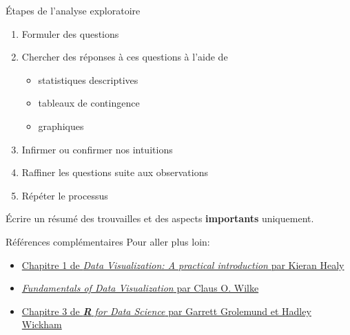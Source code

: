 \documentclass[
  ignorenonframetext,
]{beamer}
\providecommand{\tightlist}{%
  \setlength{\itemsep}{0pt}\setlength{\parskip}{0pt}}\usepackage{longtable,booktabs,array}
\begin{document}
\begin{frame}{Étapes de l'analyse exploratoire}
\protect\hypertarget{uxe9tapes-de-lanalyse-exploratoire}{}
\begin{enumerate}
\tightlist
\item
  Formuler des questions
\item
  Chercher des réponses à ces questions à l'aide de

  \begin{itemize}
  \tightlist
  \item
    statistiques descriptives
  \item
    tableaux de contingence
  \item
    graphiques
  \end{itemize}
\item
  Infirmer ou confirmer nos intuitions
\item
  Raffiner les questions suite aux observations
\item
  Répéter le processus
\end{enumerate}

Écrire un résumé des trouvailles et des aspects \textbf{importants}
uniquement.
\end{frame}

\begin{frame}{Références complémentaires}
\protect\hypertarget{ruxe9fuxe9rences-compluxe9mentaires}{}
Pour aller plus loin:

\begin{itemize}
\tightlist
\item
  \href{https://socviz.co/lookatdata.html\#lookatdata}{Chapitre 1 de
  \emph{Data Visualization: A practical introduction} par Kieran Healy}
\item
  \href{https://serialmentor.com/dataviz/}{\emph{Fundamentals of Data
  Visualization} par Claus O. Wilke}
\item
  \href{https://r4ds.had.co.nz/}{Chapitre 3 de \emph{\textbf{R} for Data
  Science} par Garrett Grolemund et Hadley Wickham}
\end{itemize}
\end{frame}
\end{document}
